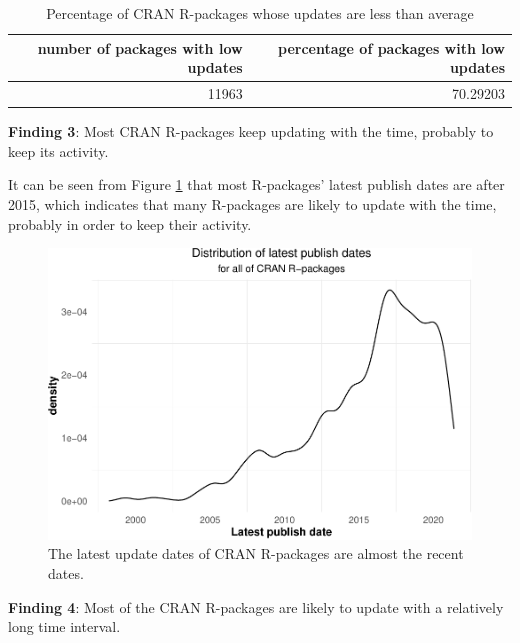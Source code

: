 \documentclass[
]{book}
\newenvironment{discovery}[1]{%
  \begin{tcolorbox}[colback=blue!30,colframe=blue!80!black]#1}{\end{tcolorbox}}
\begin{document}
\begin{table}

\caption{\label{tab:pct-lowupdates}Percentage of CRAN R-packages whose updates are less than average}
\centering
\begin{tabular}[t]{r|r}
\hline
number of packages with low updates & percentage of packages with low updates\\
\hline
11963 & 70.29203\\
\hline
\end{tabular}
\end{table}

\begin{discovery}
\textbf{Finding 3}: Most CRAN R-packages keep updating with the time,
probably to keep its activity.
\end{discovery}

It can be seen from Figure \ref{fig:latestpublish} that most R-packages' latest publish dates are after 2015, which indicates that many R-packages are likely to update with the time, probably in order to keep their activity.



\begin{figure}

{\centering \includegraphics{figures/latestpublish-1} 

}

\caption{The latest update dates of CRAN R-packages are almost the recent dates.}\label{fig:latestpublish}
\end{figure}

\begin{discovery}
\textbf{Finding 4}: Most of the CRAN R-packages are likely to update
with a relatively long time interval.
\end{discovery}
\end{document}
